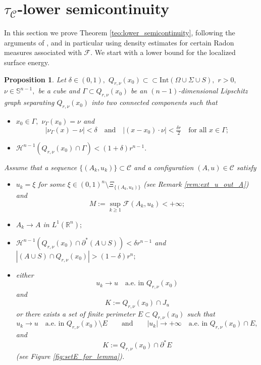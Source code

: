 \documentclass[reqno]{amsart}
\numberwithin{equation}{section}
\theoremstyle{plain}
\newtheorem{proposition}[theorem]{Proposition}
\theoremstyle{definition}
\newcommand{\R}{\mathbb{R}}
\renewcommand{\S}{\mathbb{S}}
\newcommand{\cH}{\mathcal{H}}
\newcommand{\cF}{\mathcal{F}}
\newcommand{\p}{\partial}
\newcommand{\strictlyincluded}{\subset\subset}
\newcommand{\Int}[1]{\mathrm{Int}(#1)}
\newcommand{\admissible}{\mathcal{C}}
\newcommand{\substrate}{S}
\begin{document}
\section{$\tau_\admissible$-lower semicontinuity}\label{sec:lower_semicontos}
 
In this section we prove Theorem \ref{teo:lower_semicontinuity}, following the arguments of \cite[Proposition 4.1]{HP:2020_arma}, and in particular using density estimates for certain Radon measures associated with $\cF.$
We start with a lower bound for the localized surface energy.

\begin{proposition}\label{prop:estimate_inner_jump}
Let $\delta\in(0,1),$ $Q_{r,\nu}(x_0)\strictlyincluded \Int{\Omega\cup\Sigma \cup\substrate},$ $r>0,$ $\nu\in\S^{n-1},$ be a cube and $\Gamma\subset Q_{r,\nu}(x_0)$ be an $(n-1)$-dimensional Lipschitz graph separating $Q_{r,\nu}(x_0)$ into two connected components such that 
\begin{itemize}[left=20pt]
\item[\rm(a1)] $x_0\in\Gamma,$ $\nu_\Gamma(x_0)=\nu$ and 
 $$
 |\nu_\Gamma(x)-\nu|<\delta\quad \text{and}\quad 
 |(x-x_0)\cdot \nu|<\tfrac{\delta r}{2}
 \quad\text{for all $x\in \Gamma;$}
 $$

\item[\rm(a2)] $\cH^{n-1}(Q_{r,\nu}(x_0)\cap \Gamma) <(1+\delta)r^{n-1}.$
\end{itemize}
Assume that a sequence $\{(A_k,u_k)\}\subset \admissible $ and a configuration $(A,u)\in\admissible$ satisfy 

\begin{itemize}
\item[\rm(a3)] $u_k=\xi$ for some $\xi\in (0,1)^n\setminus \Xi_{\{(A_k,u_k)\}}$  (see Remark \ref{rem:ext_u_out_A}) and 
$$
M:=\sup_{k\ge1} \cF(A_k,u_k)<+\infty;
$$
 
\item[\rm(a4)] $A_k\to A$ in $L^1(\R^n);$

\item[\rm(a5)] $\cH^{n-1}(Q_{r,\nu}(x_0)\cap \p^*(A\cup S))<\delta r^{n-1}$ and $|(A\cup S)\cap Q_{r,\nu}(x_0)|>(1-\delta)r^n;$

\item[\rm(a6)] either 
$$
u_k\to u\quad\text{a.e.\  in $Q_{r,\nu}(x_0)$}
$$
and  
$$
K:=Q_{r,\nu}(x_0)\cap J_u
$$ 
or there exists a set of finite perimeter $E\subset Q_{r,\nu}(x_0)$ such that 
$$
u_k\to u\quad \text{a.e.\  in $Q_{r,\nu}(x_0)\setminus E$}\qquad \text{and}\qquad  
|u_k|\to +\infty \quad \text{a.e.\  in $Q_{r,\nu}(x_0)\cap E,$}
$$
and 
$$
K:=Q_{r,\nu}(x_0)\cap\p^*E
$$ 
(see Figure \ref{fig:setE_for_lemma}).


\end{itemize}
\end{proposition}
\end{document}
